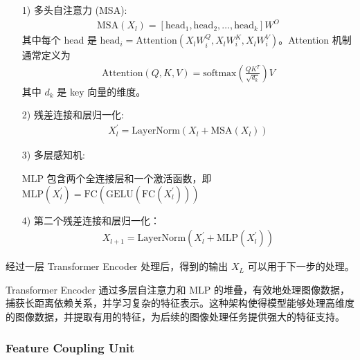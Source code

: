 \documentclass[a4paper]{ctexart}
\begin{document}
	\begin{itemize}
		\item[1)] 
		多头自注意力 (MSA):
		\begin{equation}
			\begin{aligned}
				\text{MSA}(X_l) = [\text{head}_1, \text{head}_2, \ldots, \text{head}_k] W^{O}
			\end{aligned}
			\label{eq: MSA}
		\end{equation}
		其中每个 head 是 $\text{head}_i = \text{Attention}\left(X_l W_i^Q, X_l W_i^K, X_l W_i^V \right)$。Attention 机制通常定义为
		\begin{equation}
			\begin{aligned}
				\text{Attention}(Q, K, V) = \text{softmax} \left(\frac{QK^T}{\sqrt{d_k}} \right) V
			\end{aligned}
			\label{eq: Attention}
		\end{equation}
		其中 $d_k$ 是 key 向量的维度。
		
		\item[2)]
		残差连接和层归一化:
		\begin{equation}
			\begin{aligned}
				X_l^\prime = \text{LayerNorm} \left(X_l + \text{MSA}(X_l)\right)
			\end{aligned}
			\label{eq: MSA}
		\end{equation}
		\item[3)]
		多层感知机:
		
		MLP 包含两个全连接层和一个激活函数，即 $\text{MLP} (X_l^\prime) = \text{FC}\left(\text{GELU}\left(\text{FC}(X_l^\prime)\right)\right)$
		
		\item[4)]
		第二个残差连接和层归一化：
		\begin{equation}
			\begin{aligned}
				X_{l+1} = \text{LayerNorm} (X_l^\prime + \text{MLP}(X_l^\prime))
			\end{aligned}
			\label{eq: layernorm}
		\end{equation}
	\end{itemize}
	
	经过一层 Transformer Encoder 处理后，得到的输出 $X_L$ 可以用于下一步的处理。
	
	Transformer Encoder 通过多层自注意力和 MLP 的堆叠，有效地处理图像数据，捕获长距离依赖关系，并学习复杂的特征表示。这种架构使得模型能够处理高维度的图像数据，并提取有用的特征，为后续的图像处理任务提供强大的特征支持。
	
	\subsubsection{Feature Coupling Unit}
	
\end{document}

